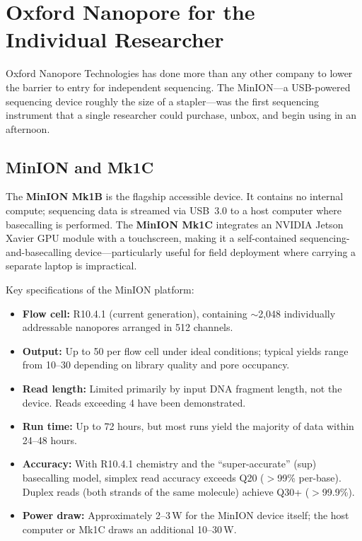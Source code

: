 \section{Oxford Nanopore for the Individual Researcher}
\label{sec:accessible:ont}

Oxford Nanopore Technologies has done more than any other company to lower the barrier to entry for independent sequencing. The MinION---a USB-powered sequencing device roughly the size of a stapler---was the first sequencing instrument that a single researcher could purchase, unbox, and begin using in an afternoon.

\subsection{MinION and Mk1C}
\label{subsec:accessible:minion}

The \textbf{MinION Mk1B} is the flagship accessible device. It contains no internal compute; sequencing data is streamed via USB~3.0 to a host computer where basecalling is performed. The \textbf{MinION Mk1C} integrates an NVIDIA Jetson Xavier GPU module with a touchscreen, making it a self-contained sequencing-and-basecalling device---particularly useful for field deployment where carrying a separate laptop is impractical.

Key specifications of the MinION platform:

\begin{itemize}[itemsep=2pt]
  \item \textbf{Flow cell:} R10.4.1 (current generation), containing ${\sim}$2,048 individually addressable nanopores arranged in 512 channels.
  \item \textbf{Output:} Up to 50\gigabase{} per flow cell under ideal conditions; typical yields range from 10--30\gigabase{} depending on library quality and pore occupancy.
  \item \textbf{Read length:} Limited primarily by input DNA fragment length, not the device. Reads exceeding 4\megabase{} have been demonstrated.
  \item \textbf{Run time:} Up to 72 hours, but most runs yield the majority of data within 24--48 hours.
  \item \textbf{Accuracy:} With R10.4.1 chemistry and the ``super-accurate'' (sup) basecalling model, simplex read accuracy exceeds Q20 ($>$99\% per-base). Duplex reads (both strands of the same molecule) achieve Q30+ ($>$99.9\%).
  \item \textbf{Power draw:} Approximately 2--3\,W for the MinION device itself; the host computer or Mk1C draws an additional 10--30\,W.
\end{itemize}

